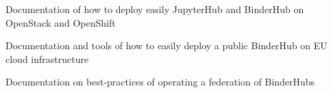 \begin{workpackage}
\begin{wpdescription}
\end{wpdescription}

\begin{tasklist}
% 



\end{tasklist}

\begin{wpdelivs}
  \begin{wpdeliv}[due=18,miles=startup,id=openstack-openshift-documentation,dissem=PU,nature=R,lead=EP]
    {Documentation of how to deploy easily JupyterHub and BinderHub on OpenStack and OpenShift}
  \end{wpdeliv}
  \begin{wpdeliv}[due=24,miles=prototype,id=eu-binder-instance,dissem=PU,nature=R,lead=SRL]
    {Documentation and tools of how to easily deploy a public BinderHub on EU
    cloud infrastructure}
  \end{wpdeliv}
  \begin{wpdeliv}[due=36,miles=community,id=binder-federation,dissem=PU,nature=R,lead=SRL]
    {Documentation on best-practices of operating a federation of BinderHubs}
  \end{wpdeliv}
\end{wpdelivs}
\end{workpackage}


